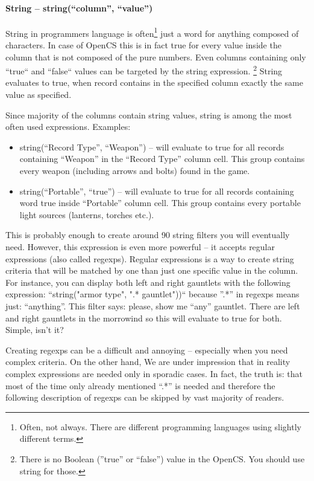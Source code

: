 \paragraph{String -- string(``column'', ``value'')}
String in programmers language is often\footnote{Often, not always. There are different programming languages using slightly different terms.}
just a word for anything composed of characters. In case of OpenCS this is in fact true for every value inside the column that is not composed
of the pure numbers. Even columns containing only ``true`` and ``false`` values can be targeted by the string expression.
\footnote{There is no Boolean (''true'' or ``false'') value in the OpenCS. You should use string for those.} String evaluates to true, 
when record contains in the specified column exactly the same value as specified.

Since majority of the columns contain string values, string is among the most often used expressions. Examples:
\begin{itemize}
 \item string(``Record Type'', ``Weapon'') -- will evaluate to true for all records containing ``Weapon'' in the ``Record Type'' column cell.
 This group contains every weapon (including arrows and bolts) found in the game.
 \item string(``Portable'', ``true'') -- will evaluate to true for all records containing word true inside ``Portable'' column cell.
 This group contains every portable light sources (lanterns, torches etc.).
\end{itemize}
This is probably enough to create around 90 string filters you will eventually need. However, this expression is even more powerful
-- it accepts regular expressions (also called regexps). Regular expressions is a way to create string criteria that will be matched 
by one than just one specific value in the column. For instance, you can display both left and right gauntlets with the following expression:
``string("armor type", ".* gauntlet"))`` because ''.*'' in regexps means just: ``anything''. This filter says: please, show me ``any'' gauntlet.
There are left and right gauntlets in the morrowind so this will evaluate to true for both. Simple, isn't it?

Creating regexps can be a difficult and annoying -- especially when you need complex criteria. On the other hand, We are under impression
that in reality complex expressions are needed only in sporadic cases. In fact, the truth is: that most of the time only already mentioned
``.*'' is needed and therefore the following description of regexps can be skipped by vast majority of readers.

